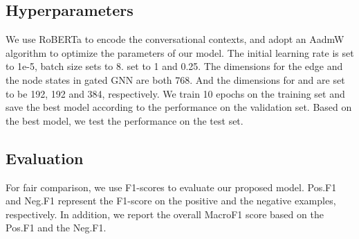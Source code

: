 \documentclass[11pt]{article}
\begin{document}
\subsection{Hyperparameters}
We use RoBERTa to encode the conversational contexts, and adopt an AadmW algorithm to optimize the parameters of our model.
The initial learning rate is set to 1e-5, batch size sets to 8.
 set to 1 and 0.25.
The dimensions for the edge and the node states in gated GNN are both 768.
And the dimensions for  and  are set to be 192, 192 and 384, respectively. 
We train 10 epochs on the training set and save the best model according to the performance on the validation set.
Based on the best model, we test the performance on the test set.

\subsection{Evaluation}
For fair comparison, we use F1-scores to evaluate our proposed model.
Pos.F1 and Neg.F1 represent the F1-score on the positive and the negative examples, respectively.
In addition, we report the overall MacroF1 score based on the Pos.F1 and the Neg.F1.
\end{document}
